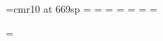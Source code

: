 \font\wheelcogs=cmr10 at 669sp
\wheelcogids=\onesp %
\wheelcogs  =\onesp %
\indexa=\@ne
\indexb=\@ne
\indexc=\@ne
{}%
\wheelcognext=\onesp %
\wheelcogdeltas=\onesp %

\newcount\wheelcogcount
\wheelcogcount=\indexc %



\def\Sieve #1.{\csname _svobj.#1\endcsname}%

\def\NewSieve#1{%
  \edef\tmp{{#1}}%
  \expandafter\_NewSieve\tmp
}%

